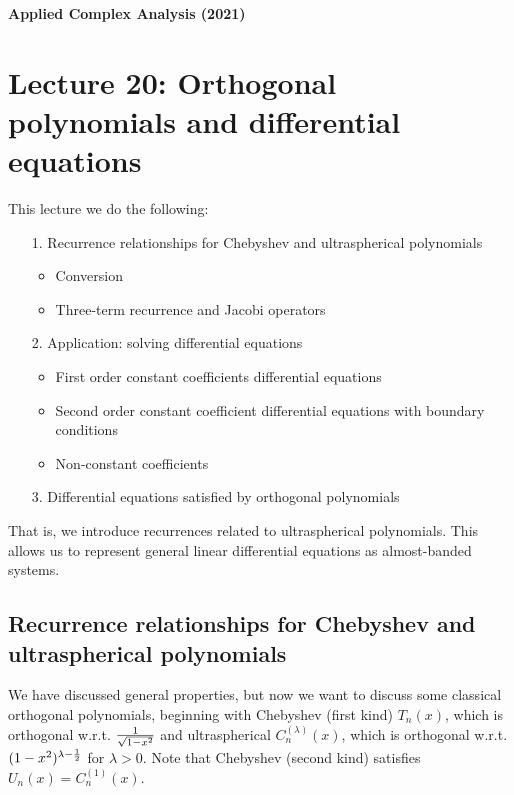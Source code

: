 \documentclass[12pt,landscape]{article}
\def\half{ {1 \over 2} }
\begin{document}
{\LARGE
\sf
\textbf{Applied Complex Analysis (2021)}

\section{Lecture 20: Orthogonal polynomials and differential equations}
This lecture we do the following:

\begin{itemize}
\item[1. ] Recurrence relationships for Chebyshev and ultraspherical polynomials

\begin{itemize}
\item Conversion


\item Three-term recurrence and Jacobi operators

\end{itemize}

\item[2. ] Application: solving differential equations

\begin{itemize}
\item First order constant coefficients differential equations


\item Second order constant coefficient differential equations with boundary conditions


\item Non-constant coefficients

\end{itemize}

\item[3. ] Differential equations satisfied by orthogonal polynomials

\end{itemize}
That is, we introduce recurrences related to ultraspherical polynomials. This allows us to represent general linear differential equations as almost-banded systems.
\newpage
\subsection{Recurrence relationships for Chebyshev and ultraspherical polynomials}
We have discussed general properties, but now we want to discuss some classical orthogonal polynomials, beginning with Chebyshev (first kind) $T_n(x)$, which is orthogonal w.r.t. $1\over \sqrt{1-x^2}$ and ultraspherical $C_n^{(\lambda)}(x)$, which is orthogonal w.r.t. $(1-x^2)^{\lambda - \half}$ for $\lambda > 0$. Note that Chebyshev (second kind) satisfies $U_n(x) = C_n^{(1)}(x)$.

}
\end{document}
